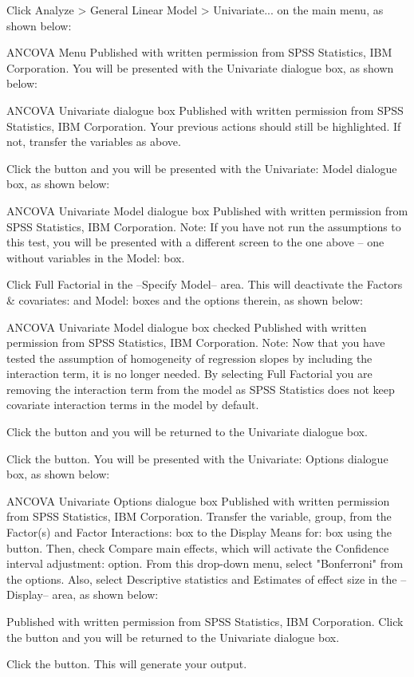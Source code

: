 Click Analyze > General Linear Model > Univariate... on the main menu, as shown below:

ANCOVA Menu
Published with written permission from SPSS Statistics, IBM Corporation.
You will be presented with the Univariate dialogue box, as shown below:

ANCOVA Univariate dialogue box
Published with written permission from SPSS Statistics, IBM Corporation.
Your previous actions should still be highlighted. If not, transfer the variables as above.

Click the  button and you will be presented with the Univariate: Model dialogue box, as shown below:

ANCOVA Univariate Model dialogue box
Published with written permission from SPSS Statistics, IBM Corporation.
Note: If you have not run the assumptions to this test, you will be presented with a different screen to the one above – one without variables in the Model: box.

Click Full Factorial in the –Specify Model– area. This will deactivate the Factors & covariates: and Model: boxes and the options therein, as shown below:

ANCOVA Univariate Model dialogue box checked
Published with written permission from SPSS Statistics, IBM Corporation.
Note: Now that you have tested the assumption of homogeneity of regression slopes by including the interaction term, it is no longer needed. By selecting Full Factorial you are removing the interaction term from the model as SPSS Statistics does not keep covariate interaction terms in the model by default.

Click the  button and you will be returned to the Univariate dialogue box.

Click the  button. You will be presented with the Univariate: Options dialogue box, as shown below:

ANCOVA Univariate Options dialogue box
Published with written permission from SPSS Statistics, IBM Corporation.
Transfer the variable, group, from the Factor(s) and Factor Interactions: box to the Display Means for: box using the  button. Then, check Compare main effects, which will activate the Confidence interval adjustment: option. From this drop-down menu, select "Bonferroni" from the options. Also, select Descriptive statistics and Estimates of effect size in the –Display– area, as shown below:


Published with written permission from SPSS Statistics, IBM Corporation.
Click the  button and you will be returned to the Univariate dialogue box.

Click the  button. This will generate your output.
